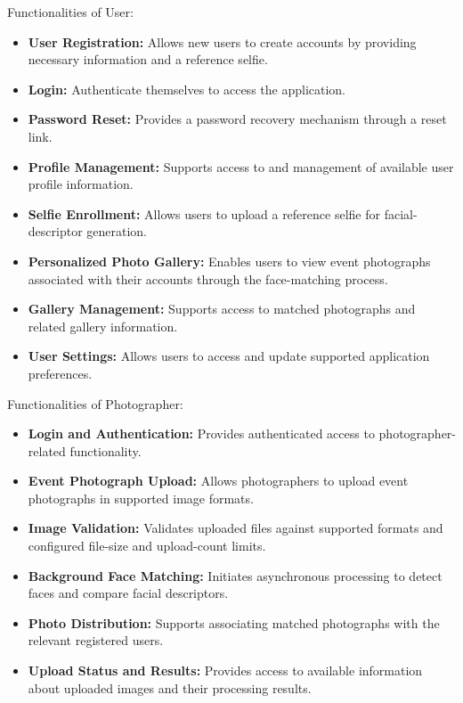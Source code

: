 
Functionalities of User:
\begin{itemize}
    \item \textbf{User Registration: } \noindent Allows new users to create accounts by providing necessary information and a reference selfie.
    \item \textbf{Login: } \noindent Authenticate themselves to access the application.
    \item \textbf{Password Reset: } \noindent Provides a password recovery mechanism through a reset link.
    \item \textbf{Profile Management: } \noindent Supports access to and management of available user profile information.
    \item \textbf{Selfie Enrollment: } \noindent Allows users to upload a reference selfie for facial-descriptor generation.
    \item \textbf{Personalized Photo Gallery: } \noindent Enables users to view event photographs associated with their accounts through the face-matching process.
    \item \textbf{Gallery Management: } \noindent Supports access to matched photographs and related gallery information.
    \item \textbf{User Settings: } \noindent Allows users to access and update supported application preferences.
\end{itemize}


Functionalities of Photographer:

\begin{itemize}
    \item \textbf{Login and Authentication: } \noindent Provides authenticated access to photographer-related functionality.
    \item \textbf{Event Photograph Upload: } \noindent Allows photographers to upload event photographs in supported image formats.
    \item \textbf{Image Validation: } \noindent Validates uploaded files against supported formats and configured file-size and upload-count limits.
    \item \textbf{Background Face Matching: } \noindent Initiates asynchronous processing to detect faces and compare facial descriptors.
    \item \textbf{Photo Distribution: } \noindent Supports associating matched photographs with the relevant registered users.
    \item \textbf{Upload Status and Results: } \noindent Provides access to available information about uploaded images and their processing results.
\end{itemize}

